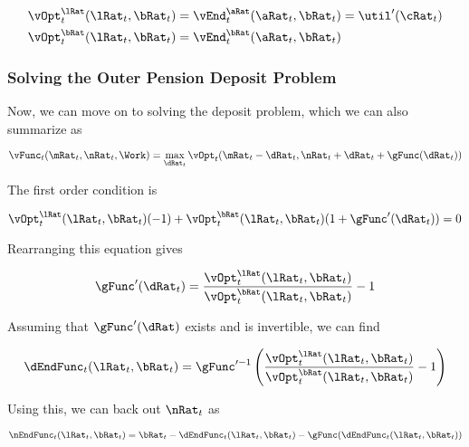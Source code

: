 \documentclass[\econtexRoot/SequentialEGM]{subfiles}
\begin{document}
\begin{equation}
	\begin{split}
		\vOpt_{t}^{\lRat}(\lRat_{t}, \bRat_{t}) & =
		\vEnd_{t}^{\aRat}(\aRat_{t}, \bRat_{t}) = \util'(\cRat_{t}) \\
		\vOpt_{t}^{\bRat}(\lRat_{t}, \bRat_{t}) & =
		\vEnd_{t}^{\bRat}(\aRat_{t}, \bRat_{t})
	\end{split}
\end{equation}

\subsubsection{Solving the Outer Pension Deposit Problem}

Now, we can move on to solving the deposit problem, which we can also summarize
as

\begin{equation}
	\vFunc_{t}(\mRat_{t}, \nRat_{t}, \Work) = \max_{\dRat_{t}}
	\vOpt_{t}(\mRat_{t}
	- \dRat_{t}, \nRat_{t} + \dRat_{t} + \gFunc(\dRat_{t}))
\end{equation}

The first order condition is

\begin{equation}
	\vOpt_{t}^{\lRat}(\lRat_{t}, \bRat_{t})(-1) +
	\vOpt_{t}^{\bRat}(\lRat_{t}, \bRat_{t})(1+\gFunc'(\dRat_{t})) = 0
\end{equation}

Rearranging this equation gives

\begin{equation}
	\gFunc'(\dRat_{t}) = \frac{\vOpt_{t}^{\lRat}(\lRat_{t},
		\bRat_{t})}{\vOpt_{t}^{\bRat}(\lRat_{t}, \bRat_{t})} - 1
\end{equation}

Assuming that $\gFunc'(\dRat)$ exists and is invertible, we can find

\begin{equation}
	\dEndFunc_{t}(\lRat_{t}, \bRat_{t}) = \gFunc'^{-1}\left(
	\frac{\vOpt_{t}^{\lRat}(\lRat_{t},
		\bRat_{t})}{\vOpt_{t}^{\bRat}(\lRat_{t},
		\bRat_{t})} - 1 \right)
\end{equation}

Using this, we can back out $\nRat_{t}$ as

\begin{equation}
	\nEndFunc_{t}(\lRat_{t}, \bRat_{t}) = \bRat_{t} -
	\dEndFunc_{t}(\lRat_{t}, \bRat_{t}) - \gFunc(\dEndFunc_{t}(\lRat_{t},
		\bRat_{t}))
\end{equation}
\end{document}

